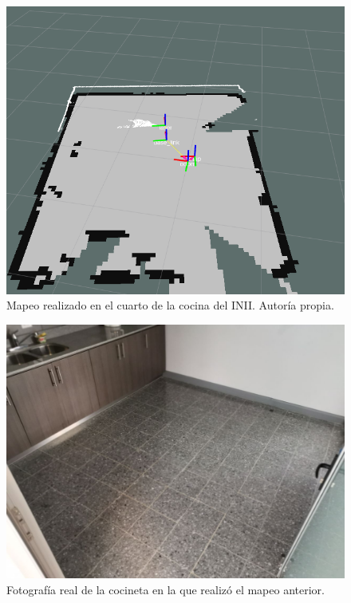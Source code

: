 \begin{figure}
\centering
\includegraphics[scale=0.6]{imagenes/mapeo_ini_cocina.png}
\caption{Mapeo realizado en el cuarto de la cocina del INII. Autoría propia.}
\end{figure}

\begin{figure}
\centering
\includegraphics[scale=0.3]{imagenes/cocineta.jpg}
\caption{Fotografía real de la cocineta en la que realizó el mapeo anterior.}
\end{figure}

